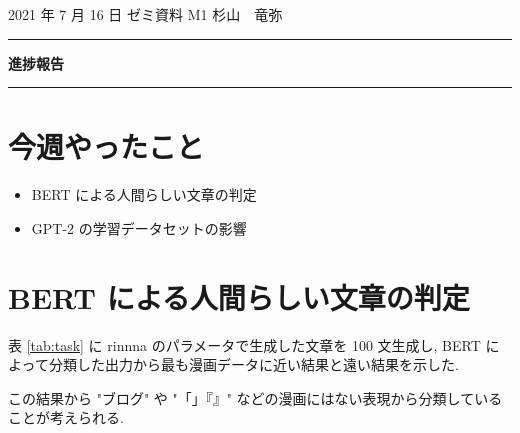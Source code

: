 \documentclass[onecolumn]{ujarticle}   %
\begin{document}

		\noindent
		\hspace{1em}
		2021 年 7 月 16 日
		ゼミ資料
		\hfill
		M1 杉山　竜弥
		\vspace{2mm}

		\hrule
		\begin{center}
			{\Large \bf 進捗報告}
		\end{center}
		\hrule
		\vspace{9mm}


\section{今週やったこと}
\begin{itemize}
  \item BERT による人間らしい文章の判定
  \item GPT-2 の学習データセットの影響
\end{itemize}

\section{BERT による人間らしい文章の判定}

表 \ref{tab:task} に rinnna のパラメータで生成した文章を 100 文生成し,
BERT によって分類した出力から最も漫画データに近い結果と遠い結果を示した.

この結果から "ブログ" や "「」『』" などの漫画にはない表現から分類していることが考えられる.
\end{document}
